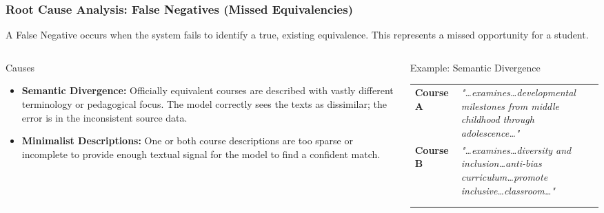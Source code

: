 \documentclass[aspectratio=169,10pt]{beamer}
\begin{document}
\begin{frame}
    \frametitle{Root Cause Analysis: False Negatives (Missed Equivalencies)}
    
    A False Negative occurs when the system fails to identify a true, existing equivalence. This represents a missed opportunity for a student.
    
    \begin{columns}[T]
        \begin{column}{0.43\textwidth}
            \begin{block}{Causes}
                \begin{itemize}\vspace*{2mm}
                    \item \textbf{Semantic Divergence:} Officially equivalent courses are described with vastly different terminology or pedagogical focus. The model correctly sees the texts as dissimilar; the error is in the inconsistent source data.
                    \item \textbf{Minimalist Descriptions:} One or both course descriptions are too sparse or incomplete to provide enough textual signal for the model to find a confident match.\vspace*{2mm}
                \end{itemize}
            \end{block}
        \end{column}
        \hfill
        \begin{column}{0.51\textwidth}
            \begin{alertblock}{Example: Semantic Divergence}
                \renewcommand{\arraystretch}{1.3}
                \begin{tabularx}{\textwidth}{>{\raggedright\arraybackslash}p{1.5cm}>{\raggedright\arraybackslash}X}
                \textbf{Course A} & \textit{"\dots examines\dots developmental milestones from middle childhood through adolescence\dots"} \\
                \textbf{Course B} & \textit{"\dots examines\dots diversity and inclusion\dots anti-bias curriculum\dots promote inclusive\dots classroom\dots"} \\
                \midrule
                \multicolumn{2}{c}{\textbf{Result:} False Negative} \\
                \multicolumn{2}{c}{(Model correctly sees texts as different)}
                \end{tabularx}
            \end{alertblock}
        \end{column}
    \end{columns}


\end{frame}
\end{document}
